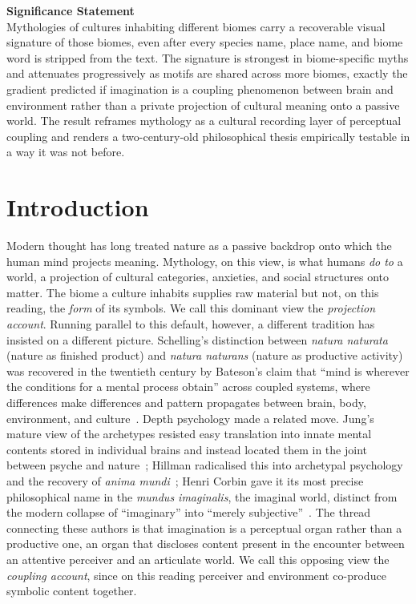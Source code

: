 \documentclass[11pt,a4paper]{article}
\begin{document}
\noindent\textbf{Significance Statement}\\[0.4em]
Mythologies of cultures inhabiting different biomes carry a recoverable
visual signature of those biomes, even after every species name, place
name, and biome word is stripped from the text. The signature is
strongest in biome-specific myths and attenuates progressively as
motifs are shared across more biomes, exactly the gradient predicted
if imagination is a coupling phenomenon between brain and environment
rather than a private projection of cultural meaning onto a passive
world. The result reframes mythology as
a cultural recording layer of perceptual coupling and renders a
two-century-old philosophical thesis empirically testable in a way it
was not before.

\vspace{1em}

\section*{Introduction}

Modern thought has long treated nature as a passive backdrop onto
which the human mind projects meaning. Mythology, on this view, is
what humans \emph{do to} a world, a projection of cultural
categories, anxieties, and social structures onto matter. The biome
a culture inhabits supplies raw material but not, on this reading,
the \emph{form} of its symbols. We call this dominant view the
\emph{projection account}. Running parallel to this default, however,
a different tradition has insisted on a different picture.
Schelling's distinction between \emph{natura naturata} (nature as
finished product) and \emph{natura naturans} (nature as productive
activity)~\citep{schelling1797ideas,schelling1799outline} was
recovered in the twentieth century by Bateson's claim that ``mind is
wherever the conditions for a mental process obtain'' across coupled
systems, where differences make differences and pattern propagates
between brain, body, environment, and
culture~\citep{bateson1972steps,bateson1979mind}. Depth psychology
made a related move. Jung's mature view of the archetypes resisted
easy translation into innate mental contents stored in individual
brains and instead located them in the joint between psyche and
nature~\citep{jung1959archetypes}; Hillman radicalised this into
archetypal psychology and the recovery of \emph{anima
mundi}~\citep{hillman1975revisioning,hillman1981thought}; Henri
Corbin gave it its most precise philosophical name in the \emph{mundus
imaginalis}, the imaginal world, distinct from the modern collapse
of ``imaginary'' into ``merely
subjective''~\citep{corbin1972mundus,barfield1957saving,abram1996spell,ingold2000perception}.
The thread connecting these authors is that imagination is a
perceptual organ rather than a productive one, an organ that
discloses content present in the encounter between an attentive
perceiver and an articulate world. We call this opposing view the
\emph{coupling account}, since on this reading perceiver and
environment co-produce symbolic content together.
\end{document}
